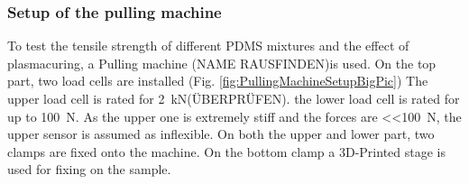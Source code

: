 \subsubsection{Setup of the pulling machine}

To test the tensile strength of different PDMS mixtures and the effect of plasmacuring, a Pulling machine (NAME RAUSFINDEN)is used. On the top part, two load cells are installed (Fig. \ref{fig:PullingMachineSetupBigPic}) The upper load cell is rated for \SI{2}{\kilo\newton}(ÜBERPRÜFEN). the lower load cell is rated for up to \SI{100}{\newton}. As the upper one is extremely stiff and the forces are \SI{<<100}{\newton}, the upper sensor is assumed as inflexible. On both the upper and lower part, two clamps are fixed onto the machine. On the bottom clamp a 3D-Printed stage is used for fixing on the sample.

